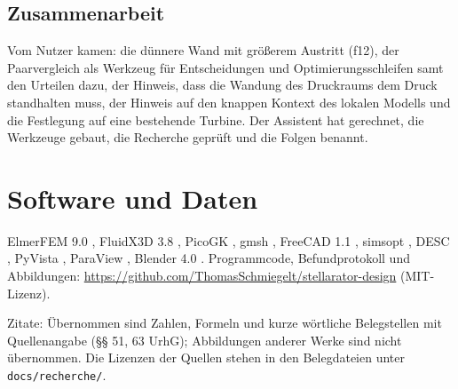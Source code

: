 \documentclass[10pt,a4paper]{article}
\begin{document}



\subsection{Zusammenarbeit}
Vom Nutzer kamen: die dünnere Wand mit größerem Austritt (f12), der Paarvergleich als Werkzeug für Entscheidungen
und Optimierungsschleifen samt den Urteilen dazu, der Hinweis, dass die Wandung des Druckraums dem Druck
standhalten muss, der Hinweis auf den knappen Kontext des lokalen Modells und die Festlegung auf eine bestehende
Turbine. Der Assistent hat gerechnet, die Werkzeuge gebaut, die Recherche geprüft und die Folgen benannt.










\section*{Software und Daten}
ElmerFEM 9.0 \cite{elmer}, FluidX3D 3.8 \cite{fluidx3d}, PicoGK \cite{picogk}, gmsh \cite{gmsh}, FreeCAD 1.1 \cite{freecad}, simsopt \cite{simsopt}, DESC
\cite{desc}, PyVista \cite{pyvista}, ParaView \cite{paraview}, Blender 4.0 \cite{blender}. Programmcode, Befundprotokoll und Abbildungen:
\url{https://github.com/ThomasSchmiegelt/stellarator-design} (MIT-Lizenz).

Zitate: Übernommen sind Zahlen, Formeln und kurze wörtliche Belegstellen mit Quellenangabe (§§ 51, 63 UrhG); Abbildungen
anderer Werke sind nicht übernommen. Die Lizenzen der Quellen stehen in den Belegdateien unter \texttt{docs/recherche/}.
\end{document}
